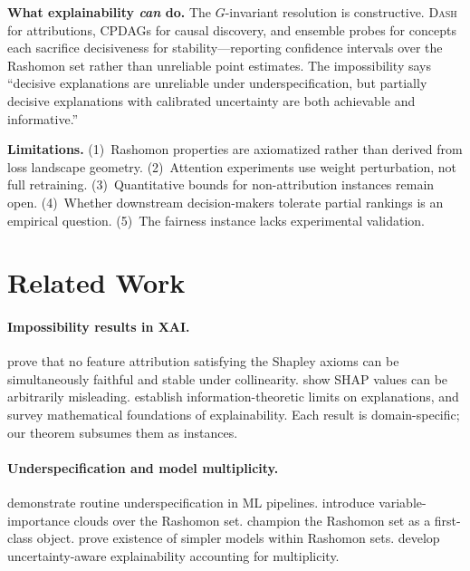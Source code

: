 \documentclass{article}
\newcommand{\DASH}{\textsc{Dash}}
\begin{document}
\textbf{What explainability \emph{can} do.}
The $G$-invariant resolution is constructive.  \DASH{} for attributions, CPDAGs for causal discovery, and ensemble probes for concepts each sacrifice decisiveness for stability---reporting confidence intervals over the Rashomon set rather than unreliable point estimates.  The impossibility says ``decisive explanations are unreliable under underspecification, but partially decisive explanations with calibrated uncertainty are both achievable and informative.''



\textbf{Limitations.}
(1)~Rashomon properties are axiomatized rather than derived from loss landscape geometry.
(2)~Attention experiments use weight perturbation, not full retraining.
(3)~Quantitative bounds for non-attribution instances remain open.
(4)~Whether downstream decision-makers tolerate partial rankings is an empirical question.
(5)~The fairness instance lacks experimental validation.




\newpage
\appendix

\section{Related Work}
\label{app:related}

\paragraph{Impossibility results in XAI.}
\citet{bilodeau2024impossibility} prove that no feature attribution satisfying
the Shapley axioms can be simultaneously faithful and stable under collinearity.
\citet{huang2024failings} show SHAP values can be arbitrarily misleading.
\citet{rao2025limits} establish information-theoretic limits on explanations, and
\citet{noguer2025mathematical} survey mathematical foundations of explainability.
Each result is domain-specific; our theorem subsumes them as instances.

\paragraph{Underspecification and model multiplicity.}
\citet{damour2022underspecification} demonstrate routine underspecification in ML pipelines.
\citet{fisher2019models} introduce variable-importance clouds over the Rashomon set.
\citet{rudin2024amazing} champion the Rashomon set as a first-class object.
\citet{semenova2022existence} prove existence of simpler models within Rashomon sets.
\citet{marx2024uncertainty} develop uncertainty-aware explainability accounting for multiplicity.
\end{document}
